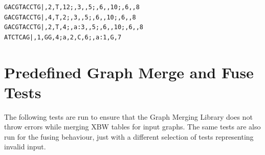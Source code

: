 \documentclass[a4paper,12pt,twoside,BCOR=10mm]{scrbook}
\begin{document}
\begin{lstlisting}
GACGTACCTG|,2,T,12;,3,,5;,6,,10;,6,,8
GACGTACCTG|,4,T,2;,3,,5;,6,,10;,6,,8
GACGTACCTG|,2,T,4;,a:3,,5;,6,,10;,6,,8
ATCTCAG|,1,GG,4;a,2,C,6;,a:1,G,7
\end{lstlisting}

\section{Predefined Graph Merge and Fuse Tests}
\label{sec:appendix_graph_merge_tests}
%


The following tests are run to ensure that the Graph Merging Library does not throw errors 
while merging XBW tables for input graphs. The same tests are also run for the fusing 
behaviour, just with a different selection of tests representing invalid input.
\end{document}
